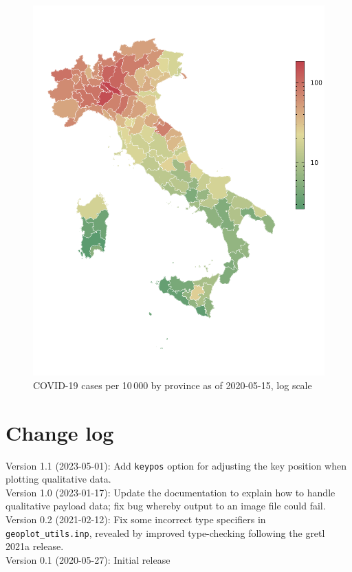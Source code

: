 \documentclass{article}
\begin{document}
\begin{figure}[p]
  \centering
  \includegraphics{covid.pdf}
  \caption{COVID-19 cases per 10\,000 by province as of
    2020-05-15, log scale}
  \label{fig:ita-covid}
\end{figure}

\section{Change log}

Version 1.1 (2023-05-01): Add \texttt{keypos} option for adjusting the key
position when plotting qualitative data. \\[6pt]
Version 1.0 (2023-01-17): Update the documentation to explain how to handle
qualitative payload data; fix bug whereby output to an image
file could fail. \\[6pt]
Version 0.2 (2021-02-12): Fix some incorrect type specifiers in
\verb|geoplot_utils.inp|, revealed by improved type-checking following
the gretl 2021a release. \\[6pt]
Version 0.1 (2020-05-27): Initial release
\end{document}
